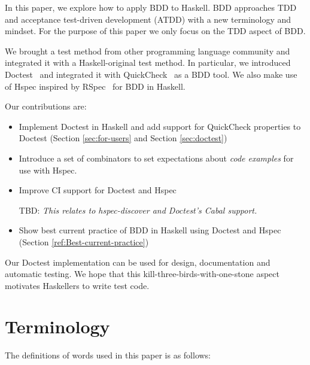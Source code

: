 \documentclass[preprint]{sigplanconf}
\begin{document}
In this paper, we explore how to apply BDD to Haskell.
BDD approaches
TDD and acceptance test-driven development (ATDD)
with a new terminology and mindset. 
For the purpose of this paper we only focus on the TDD aspect of BDD.

We brought a test method from other programming language community and
integrated it with a Haskell-original test method.
In particular, we introduced Doctest~\cite{doctest} and
integrated it with QuickCheck~\cite{quickcheck} as a BDD tool.
We also make use of Hspec inspired by RSpec~\cite{rspec} for
BDD in Haskell.

Our contributions are:

\begin{itemize}
\item
    Implement Doctest in Haskell and add support for QuickCheck properties to Doctest (Section
    \ref{sec:for-users} and Section \ref{sec:doctest})

\item
    Introduce a set of combinators to set expectations about
    \emph{code examples} for use with Hspec.

\item
    Improve CI support for Doctest and Hspec

    TBD:
    \emph{This relates to hspec-discover and Doctest's Cabal support.}

\item
    Show best current practice of BDD in Haskell using Doctest and
    Hspec (Section \ref{ref:Best-current-practice})

\end{itemize}

\noindent Our Doctest implementation
can be used for design, documentation and automatic testing.
We hope that this kill-three-birds-with-one-stone aspect
motivates Haskellers to write test code.

\section{Terminology}

The definitions of words used in this paper is as follows:
\end{document}
